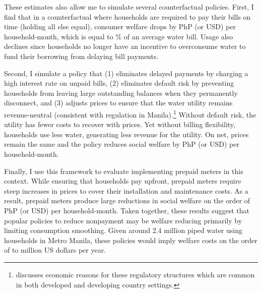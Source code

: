 \documentclass[12pt,table]{article}
\begin{document}
These estimates also allow me to simulate several counterfactual policies.  First, I find that in a counterfactual where households are required to pay their bills on time (holding all else equal), consumer welfare drops by PhP (or USD) per household-month, which is equal to \unskip\% of an average water bill.  Usage also declines since households no longer have an incentive to overconsume water to fund their borrowing from delaying bill payments.  

Second, I simulate a policy that (1) eliminates delayed payments by charging a high interest rate on unpaid bills, (2) eliminates default risk by preventing households from leaving large outstanding balances when they permanently disconnect, and (3) adjusts prices to ensure that the water utility remains revenue-neutral (consistent with regulation in Manila).\footnote{\cite{laffont2005regulation} discusses economic reasons for these regulatory structures which are common in both developed and developing country settings.}  Without default risk, the utility has fewer costs to recover with prices. Yet without billing flexibility, households use less water, generating less revenue for the utility.  On net, prices remain the same and the policy reduces social welfare by PhP (or USD) per household-month.  

Finally, I use this framework to evaluate implementing prepaid meters in this context.  While ensuring that households pay upfront, prepaid meters require steep increases in prices to cover their installation and maintenance costs.  As a result, prepaid meters produce large reductions in social welfare on the order of PhP (or USD) per household-month.  Taken together, these results suggest that popular policies to reduce nonpayment may be welfare reducing primarily by limiting consumption smoothing.  Given around 2.4 million piped water using households in Metro Manila, these policies would imply welfare costs on the order of to million US dollars per year. 
\end{document}
